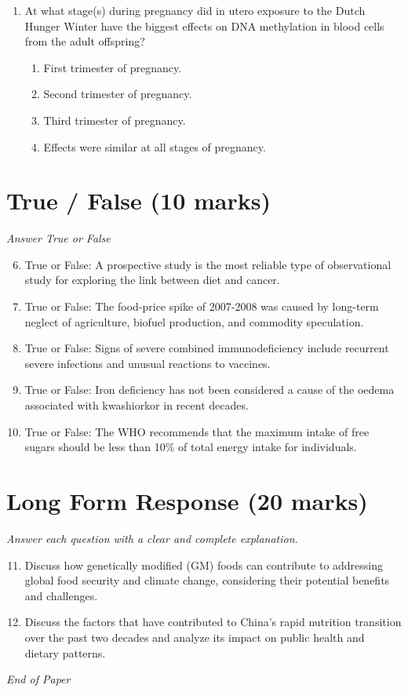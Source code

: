 \documentclass[12pt]{article}
\begin{document}
\begin{enumerate}[label=\arabic*.]
\begin{enumerate}[label=(\alph*)]
\end{enumerate}
\item At what stage(s) during pregnancy did in utero exposure to the Dutch Hunger Winter have the biggest effects on DNA methylation in blood cells from the adult offspring?
\begin{enumerate}[label=(\alph*)]
    \item First trimester of pregnancy.
    \item Second trimester of pregnancy.
    \item Third trimester of pregnancy.
    \item Effects were similar at all stages of pregnancy.
\end{enumerate}
\end{enumerate}

\section*{True / False (10 marks)}
\textit{Answer True or False}
\begin{enumerate}[label=\arabic*.]
\setcounter{enumi}{5}
\item True or False: A prospective study is the most reliable type of observational study for exploring the link between diet and cancer.
\item True or False: The food-price spike of 2007-2008 was caused by long-term neglect of agriculture, biofuel production, and commodity speculation.
\item True or False: Signs of severe combined immunodeficiency include recurrent severe infections and unusual reactions to vaccines.
\item True or False: Iron deficiency has not been considered a cause of the oedema associated with kwashiorkor in recent decades.
\item True or False: The WHO recommends that the maximum intake of free sugars should be less than 10\% of total energy intake for individuals.
\end{enumerate}

\section*{Long Form Response (20 marks)}
\textit{Answer each question with a clear and complete explanation.}
\begin{enumerate}[label=\arabic*.]
\setcounter{enumi}{10}
\item Discuss how genetically modified (GM) foods can contribute to addressing global food security and climate change, considering their potential benefits and challenges.
\item Discuss the factors that have contributed to China's rapid nutrition transition over the past two decades and analyze its impact on public health and dietary patterns.
\end{enumerate}

\vfill
\noindent\textit{End of Paper}
\end{document}
